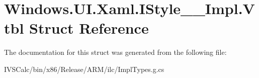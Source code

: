 \hypertarget{struct_windows_1_1_u_i_1_1_xaml_1_1_i_style_____impl_1_1_vtbl}{}\section{Windows.\+U\+I.\+Xaml.\+I\+Style\+\_\+\+\_\+\+Impl.\+Vtbl Struct Reference}
\label{struct_windows_1_1_u_i_1_1_xaml_1_1_i_style_____impl_1_1_vtbl}


The documentation for this struct was generated from the following file\+:\begin{DoxyCompactItemize}
\item 
I\+V\+S\+Calc/bin/x86/\+Release/\+A\+R\+M/ilc/Impl\+Types.\+g.\+cs\end{DoxyCompactItemize}
